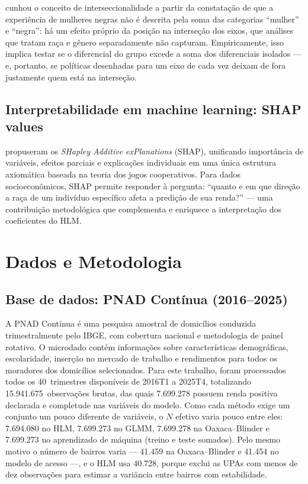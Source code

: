 \documentclass[12pt, a4paper, oneside]{article}
\let\oldsubsectionFB\subsection
\renewcommand{\subsection}{\FloatBarrier\oldsubsectionFB}
\begin{document}
 cunhou o conceito de interseccionalidade a partir da
constatação de que a experiência de mulheres negras não é descrita pela soma
das categorias ``mulher'' e ``negra'': há um efeito próprio da posição na
interseção dos eixos, que análises que tratam raça e gênero separadamente não
capturam. Empiricamente, isso implica testar se o diferencial do grupo excede a
soma dos diferenciais isolados --- e, portanto, se políticas desenhadas para um
eixo de cada vez deixam de fora justamente quem está na interseção.

\subsection{Interpretabilidade em machine learning: SHAP values}

 propuseram os \textit{SHapley Additive exPlanations}
(SHAP), unificando importância de variáveis, efeitos parciais e explicações
individuais em uma única estrutura axiomática baseada na teoria dos jogos
cooperativos. Para dados socioeconômicos, SHAP permite responder à pergunta:
``quanto e em que direção a raça de um indivíduo específico afeta a predição
de sua renda?'' --- uma contribuição metodológica que complementa e enriquece
a interpretação dos coeficientes do HLM.

\section{Dados e Metodologia}
\label{sec:metodologia}

\subsection{Base de dados: PNAD Contínua (2016--2025)}

A PNAD Contínua é uma pesquisa amostral de domicílios conduzida
trimestralmente pelo IBGE, com cobertura nacional e metodologia de painel
rotativo. O microdado contém informações sobre características demográficas,
escolaridade, inserção no mercado de trabalho e rendimentos para todos os
moradores dos domicílios selecionados. Para este trabalho, foram processados
todos os 40~trimestres disponíveis de 2016T1 a 2025T4, totalizando
15.941.675~observações brutas, das quais 7.699.278 possuem renda positiva
declarada e completude nas variáveis do modelo. Como cada método exige um conjunto um pouco
diferente de variáveis, o $N$ efetivo varia pouco entre eles: 7.694.080 no HLM,
7.699.273 no GLMM, 7.699.278 na Oaxaca--Blinder e 7.699.273 no aprendizado de máquina
(treino e teste somados). Pelo mesmo motivo o número de bairros varia ---
41.459 na Oaxaca--Blinder e 41.454 no modelo de acesso ---, e o HLM
usa 40.728, porque exclui as UPAs com menos de dez observações para estimar a
variância entre bairros com estabilidade.
\end{document}
